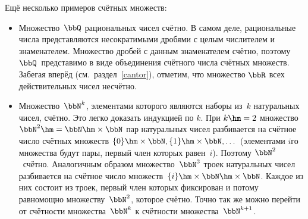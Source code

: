 \medskip
Ещё несколько примеров счётных множеств:
\begin{itemize}
\item
Множество~$\bbQ$\index{$\bbQ$} рациональных чисел
счётно. В самом деле,
рациональные числа представляются несократимыми дробями с целым
числителем и знаменателем. Множество дробей с данным знаменателем
счётно, поэтому $\bbQ$~представимо в виде
объединения счётного числа счётных множеств. Забегая вперёд
(см.~раздел~\ref{cantor}), отметим, что множество $\bbR$\index{$\bbR$} всех
действительных чисел несчётно.
\item
Множество~$\bbN^k$, элементами которого являются наборы
из~$k$ натуральных чисел, счётно. Это легко доказать индукцией
по $k$. При $k\hm=2$ множество
$\bbN^2\hm=\bbN\hm\times\bbN$ пар натуральных
чисел разбивается на счётное число счётных множеств
$\{0\}\hm\times\bbN, \{1\}\hm\times\bbN, \dots$
(элементами $i$\д го множества будут пары, первый член которых равен~$i$).
Поэтому $\bbN^2$~счётно. Аналогичным образом множество~$\bbN^3$
троек натуральных чисел разбивается на счётное
число множеств~$\{i\}\hm\times\bbN\hm\times\bbN$.
Каждое из них состоит из троек, первый член которых фиксирован и
потому равномощно множеству~$\bbN^2$, которое счётно.
Точно так же можно перейти от счётности множества~$\bbN^k$
к счётности множества~$\bbN^{k+1}$.


\end{itemize}
